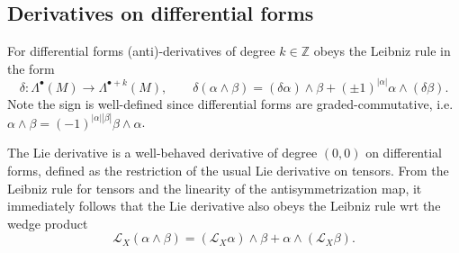 \subsection{Derivatives on differential forms} 

For differential forms (anti)-derivatives of degree $k\in \mathbb{Z}$ obeys the Leibniz rule in the form
\begin{equation}
    \delta: \Lambda^\bullet (M) \to \Lambda^{\bullet+k} (M), \qquad \delta (\alpha \wedge \beta) = (\delta \alpha) \wedge \beta + (\pm1)^{|\alpha|} \alpha \wedge (\delta \beta).
\end{equation}
Note the sign is well-defined since differential forms are graded-commutative, i.e. $\alpha \wedge \beta = (-1)^{|\alpha||\beta|} \beta \wedge \alpha$.

\begin{mytheorem}
The Lie derivative is a well-behaved derivative of degree $(0,0)$ on differential forms, defined as the restriction of the usual Lie derivative on tensors.
From the Leibniz rule for tensors and the linearity of the antisymmetrization map, it immediately follows that the Lie derivative also obeys the Leibniz rule wrt the wedge product
\begin{equation}
    \mathcal{L}_X(\alpha \wedge \beta) = (\mathcal{L}_X \alpha) \wedge \beta + \alpha \wedge (\mathcal{L}_X \beta).
\end{equation}
\end{mytheorem}


